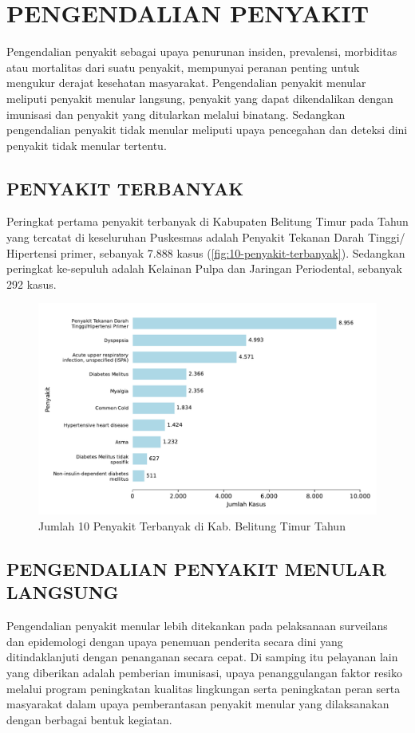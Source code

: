 \chapter{PENGENDALIAN PENYAKIT}
Pengendalian penyakit sebagai upaya penurunan insiden, prevalensi, morbiditas atau mortalitas dari suatu penyakit, mempunyai peranan penting untuk mengukur derajat kesehatan masyarakat. Pengendalian penyakit menular meliputi penyakit menular langsung, penyakit yang dapat dikendalikan dengan imunisasi dan penyakit yang ditularkan melalui binatang. Sedangkan pengendalian penyakit tidak menular meliputi upaya pencegahan dan deteksi dini penyakit tidak menular tertentu.

\section{PENYAKIT TERBANYAK}
Peringkat pertama penyakit terbanyak di Kabupaten Belitung Timur pada Tahun \tP yang tercatat di keseluruhan Puskesmas adalah Penyakit Tekanan Darah Tinggi/ Hipertensi primer, sebanyak 7.888 kasus (\autoref{fig:10-penyakit-terbanyak}).
Sedangkan peringkat ke-sepuluh adalah Kelainan Pulpa dan Jaringan Periodental, sebanyak 292 kasus.

\begin{figure}[H]
    \centering
    \includegraphics[width=\textwidth]{bab_06/bab_06_00_penyakitTerbanyak}
    \caption{Jumlah 10 Penyakit Terbanyak di Kab. Belitung Timur Tahun \tP}
    \label{fig:10-penyakit-terbanyak}
\end{figure}

\section[PENGENDALIAN PM]{PENGENDALIAN PENYAKIT MENULAR LANGSUNG}
Pengendalian penyakit menular lebih ditekankan pada pelaksanaan surveilans dan epidemologi dengan upaya penemuan penderita secara dini yang ditindaklanjuti dengan penanganan secara cepat. Di samping itu pelayanan lain yang diberikan adalah pemberian imunisasi, upaya penanggulangan faktor resiko melalui program peningkatan kualitas lingkungan serta peningkatan peran serta masyarakat dalam upaya pemberantasan penyakit menular yang dilaksanakan dengan berbagai bentuk kegiatan.

